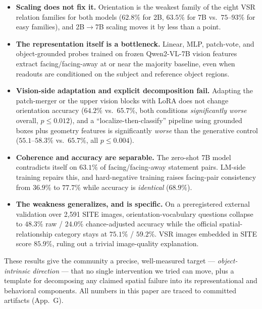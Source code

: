 \begin{itemize}
\item \textbf{Scaling does not fix it.} Orientation is the weakest family of the
eight VSR relation families for both models ($62.8\%$ for 2B, $63.5\%$ for 7B vs.\
$75$--$93\%$ for easy families), and 2B$\rightarrow$7B scaling moves it by less than
a point.
\item \textbf{The representation itself is a bottleneck.} Linear, MLP, patch-vote,
and object-grounded probes trained on frozen Qwen2-VL-7B vision features extract
facing/facing-away at or near the majority baseline, even when readouts are
conditioned on the subject and reference object regions.
\item \textbf{Vision-side adaptation and explicit decomposition fail.}
Adapting the patch-merger or the upper vision blocks with LoRA does not change
orientation accuracy ($64.2\%$ vs.\ $65.7\%$, both conditions \emph{significantly
worse} overall, $p \leq 0.012$), and a ``localize-then-classify'' pipeline using
grounded boxes plus geometry features is significantly \emph{worse} than the
generative control ($55.1$--$58.3\%$ vs.\ $65.7\%$, all $p \leq 0.004$).
\item \textbf{Coherence and accuracy are separable.} The zero-shot 7B model
contradicts itself on $63.1\%$ of facing/facing-away statement pairs. LM-side
training repairs this, and hard-negative training raises facing-pair consistency
from $36.9\%$ to $77.7\%$ while accuracy is \emph{identical} ($68.9\%$).
\item \textbf{The weakness generalizes, and is specific.} On a preregistered
external validation over 2{,}591 SITE images, orientation-vocabulary questions
collapse to $48.3\%$ raw / $24.0\%$ chance-adjusted accuracy while the official
spatial-relationship category stays at $75.1\%$ / $59.2\%$. VSR images embedded in
SITE score $85.9\%$, ruling out a trivial image-quality explanation.
\end{itemize}

These results give the community a precise, well-measured target ---
\emph{object-intrinsic direction} --- that no single intervention we tried can
move, plus a template for decomposing any claimed spatial failure into its
representational and behavioral components. All numbers in this paper are traced
to committed artifacts (App.~G).

